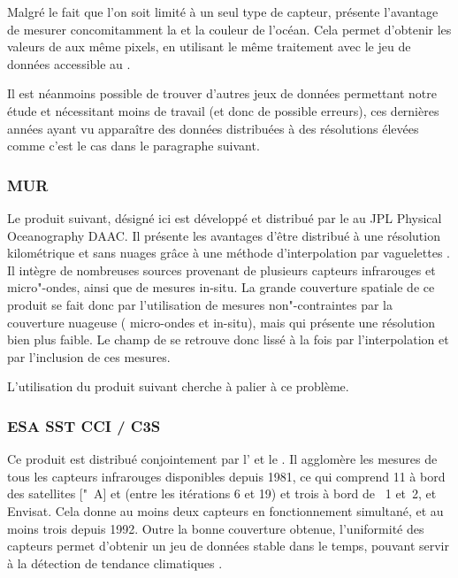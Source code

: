 Malgré le fait que l'on soit limité à un seul type de capteur,  présente l'avantage de mesurer concomitamment la  et la couleur de l'océan.
Cela permet d'obtenir les valeurs de  aux même pixels, en utilisant le même traitement avec le jeu de données accessible au  \parencite{chl_modis}.

Il est néanmoins possible de trouver d'autres jeux de données permettant notre étude et nécessitant moins de travail (et donc de possible erreurs), ces dernières années ayant vu apparaître des données distribuées à des résolutions élevées comme c'est le cas dans le paragraphe suivant.

\subsubsection{MUR}

Le produit suivant, désigné ici  est développé et distribué par le  au JPL Physical Oceanography DAAC.
Il présente les avantages d'être distribué à une résolution kilométrique et sans nuages grâce à une méthode d'interpolation par vaguelettes \parencite{chin_2017}.
Il intègre de nombreuses sources provenant de plusieurs capteurs infrarouges et micro"-ondes, ainsi que de mesures in-situ.
La grande couverture spatiale de ce produit se fait donc par l'utilisation de mesures non"-contraintes par la couverture nuageuse ( micro-ondes et in-situ), mais qui présente une résolution bien plus faible.
Le champ de  se retrouve donc lissé à la fois par l'interpolation et par l'inclusion de ces mesures.

L'utilisation du produit suivant cherche à palier à ce problème.

\subsubsection{ESA SST CCI / C3S}

Ce produit est distribué conjointement par l'   et le .
Il agglomère les mesures de tous les capteurs infrarouges disponibles depuis 1981, ce qui comprend 11  à bord des satellites ["~A] et  (entre les itérations 6 et 19) et trois  à bord de ~1 et~2, et Envisat.
Cela donne au moins deux capteurs en fonctionnement simultané, et au moins trois depuis 1992.
Outre la bonne couverture obtenue, l'uniformité des capteurs permet d'obtenir un jeu de données stable dans le temps, pouvant servir à la détection de tendance climatiques \parencite{merchant_2019}.

